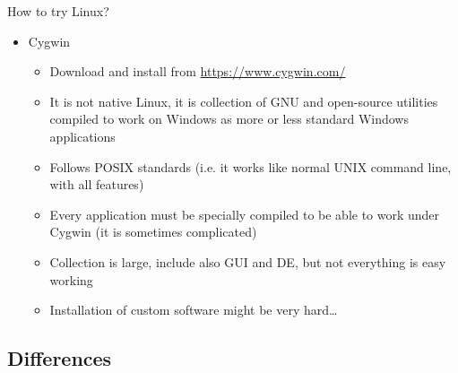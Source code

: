 \documentclass[compress, xelatex, 11pt, xcolor=svgnames, aspectratio=169, url={hyphens, lowtilde}]{beamer}
\begin{document}
\begin{frame}[allowframebreaks]{How to try Linux?}
\begin{itemize}
		\begin{itemize}
			\item To install follow \url{https://learn.microsoft.com/windows/wsl/about}
			\item Version 1 only for command-line applications (it has some problems with paths, text files,~\ldots)
			\item Version 2 works well for most of tasks and allows GUI (experimental)
		\end{itemize}
		\item Cygwin
		\begin{itemize}
			\item Download and install from \url{https://www.cygwin.com/}
			\item It is not native Linux, it is collection of GNU and open-source utilities compiled to work on Windows as more or less standard Windows applications
			\item Follows POSIX standards (i.e. it works like normal UNIX command line, with all features)
			\item Every application must be specially compiled to be able to work under Cygwin (it is sometimes complicated)
			\item Collection is large, include also GUI and DE, but not everything is easy working
			\item Installation of custom software might be very hard\ldots
		\end{itemize}
	\end{itemize}
\end{frame}

\subsection{Differences}
\end{document}
